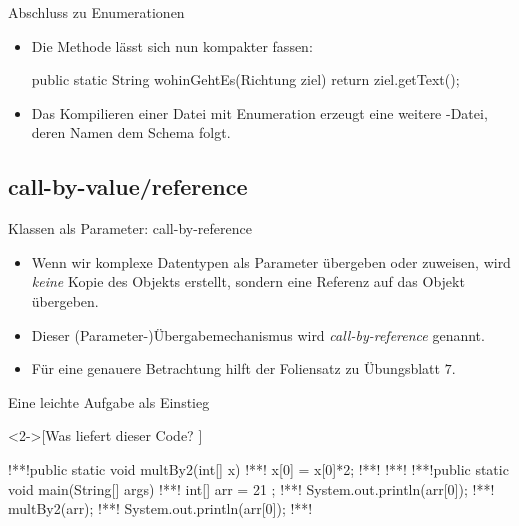 \begin{frame}[fragile]{Abschluss zu Enumerationen}
    \begin{itemize}[<+(1)->]
        \widei
        \item Die Methode  lässt sich nun kompakter fassen:\pause{}
\begin{plainjava}
public static String wohinGehtEs(Richtung ziel){
    return ziel.getText();
}
\end{plainjava}
        \item Das Kompilieren einer Datei mit Enumeration erzeugt eine weitere -Datei,\pause{} deren Namen dem Schema  folgt.
    \end{itemize}
\end{frame}


\subsection{call-by-value/reference}
\begin{frame}[fragile]{Klassen als Parameter: call-by-reference}
    \begin{itemize}[<+(1)->]
        \widei
        \item \hypertarget<1>{mrk:call-by-ref}{Wenn} wir komplexe Datentypen als Parameter übergeben oder zuweisen,\pause{} wird \emph{keine} Kopie des Objekts erstellt,\pause{} sondern eine Referenz auf das Objekt übergeben.
        \item Dieser (Parameter-)Übergabemechanismus wird \emph{call-by-reference} genannt.
        \item Für eine genauere Betrachtung hilft der Foliensatz zu Übungsblatt \(7\).
    \end{itemize}
\end{frame}

\ifull
\begin{frame}[fragile,c]{Eine leichte Aufgabe als Einstieg}
    \begin{exercise}<2->[Was liefert dieser Code? ]
        \begin{plainjava}
!**!public static void multBy2(int[] x){
!**!    x[0] = x[0]*2;
!**!}
!**!
!**!public static void main(String[] args) {
!**!    int[] arr = { 21 };
!**!    System.out.println(arr[0]);
!**!    multBy2(arr);
!**!    System.out.println(arr[0]);
!**!}
        \end{plainjava}
    \end{exercise}
\end{frame}


